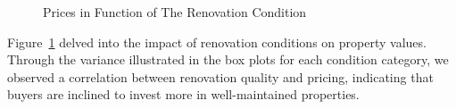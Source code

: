 \documentclass[
  letterpaper,
  DIV=11,
  numbers=noendperiod]{scrartcl}
\begin{document}
\begin{figure}


\caption{\label{fig-renovation-condition}Prices in Function of The
Renovation Condition}

\end{figure}%

Figure~\ref{fig-renovation-condition} delved into the impact of
renovation conditions on property values. Through the variance
illustrated in the box plots for each condition category, we observed a
correlation between renovation quality and pricing, indicating that
buyers are inclined to invest more in well-maintained properties.
\end{document}
